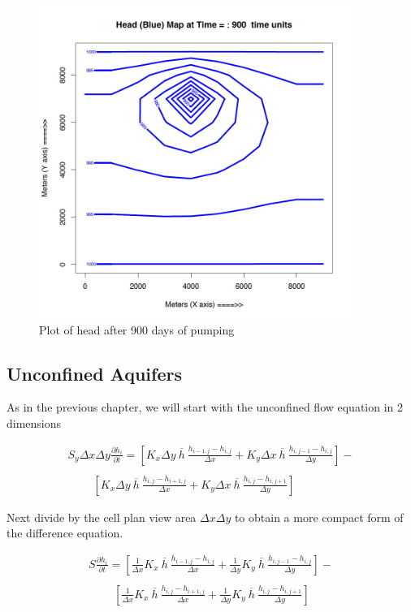 \begin{figure}[h!] %
   \centering
   \includegraphics[height=4in]{./18-UnsteadyGroundwaterFlow/HubblevillePlot900.jpg} 
   \caption{Plot of head after 900 days of pumping}
   \label{fig:HubblevillePlot900}
\end{figure}


\clearpage

\subsection{Unconfined Aquifers}
As in the previous chapter, we will start with the unconfined flow equation in 2 dimensions

\begin{equation}
\begin{matrix}
S_{y} \Delta x \Delta y \frac{\partial h_i}{\partial t} = 
[ K_{x} \Delta y ~\overline{h}~ \frac{h_{i-1,j} - h_{i,j}}{\Delta x} +
 K_{y} \Delta x ~\overline{h}~ \frac{h_{i,j-1} - h_{i,j}}{\Delta y}] - \\
~~~~~~~~~~\\
~~~~~~~~~~[ K_{x} \Delta y ~\overline{h}~ \frac{h_{i,j} - h_{i+1,j}}{\Delta x} +
K_{y} \Delta x ~\overline{h}~ \frac{h_{i,j} - h_{i,j+1}}{\Delta y} ]        
\end{matrix}        
\end{equation}

Next divide by the cell plan view area $\Delta x \Delta y$ to obtain a more compact form of the difference equation.

\begin{equation}
\begin{matrix}
S \frac{\partial h_i}{\partial t} = 
[\frac{1}{\Delta x} K_{x}~\overline{h}~ \frac{h_{i-1,j} - h_{i,j}}{\Delta x} +
 \frac{1}{\Delta y} K_{y}~\overline{h}~ \frac{h_{i,j-1} - h_{i,j}}{\Delta y}] - \\
~~~~~~~~~~\\
~~~~~~~~~~[ \frac{1}{\Delta x} K_{x}~\overline{h}~  \frac{h_{i,j} - h_{i+1,j}}{\Delta x} +
  \frac{1}{\Delta y}  K_{y}~\overline{h}~ \frac{h_{i,j} - h_{i,j+1}}{\Delta y} ]        
\end{matrix}        
\end{equation}

